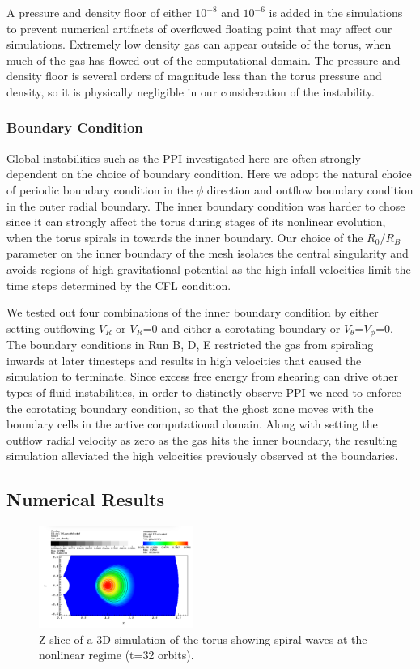 \documentclass[iop,revtex4]{emulateapj}
\begin{document}
\par A pressure and density floor of either $10^{-8}$ and $10^{-6}$ is added in the simulations to prevent numerical artifacts of overflowed floating point that may affect our simulations. Extremely low density gas can appear outside of the torus, when much of the gas has flowed out of the computational domain. The pressure and density floor is several orders of magnitude less than the torus pressure and density, so it is physically negligible in our consideration of the instability.
\subsubsection{Boundary Condition\label{sec:BC}}
\par Global instabilities such as the \ac{PPI} investigated here are often strongly dependent on the choice of boundary condition. Here we adopt the natural choice of  periodic boundary condition in the $\phi$ direction and outflow boundary condition in the outer radial boundary. The inner boundary condition was harder to chose since it can strongly affect the torus during stages of its nonlinear evolution, when the torus spirals in towards the inner boundary. Our choice of the $R_0/R_B$ parameter on the inner boundary of the mesh isolates the central singularity and avoids regions of high gravitational potential as the high infall velocities limit the time steps determined by the \ac{CFL} condition. 
\par We tested out four combinations of the inner boundary condition by either setting outflowing $V_R$ or $V_R$=0 and either a corotating boundary or $V_\theta$=$V_\phi$=0. The boundary conditions in Run B, D, E restricted the gas from spiraling inwards at later timesteps and results in high velocities that caused the simulation to terminate. Since excess free energy from shearing can drive other types of fluid instabilities, in order to distinctly observe \ac{PPI} we need to enforce the corotating boundary condition, so that the ghost zone moves with the boundary cells in the active computational domain.  Along with setting the outflow radial velocity as zero as the gas hits the inner boundary, the resulting simulation alleviated the high velocities previously observed at the boundaries. 
\subsection{Numerical Results\label{ppi_results}}
\begin{figure}
\includegraphics[width=0.45\textwidth,bb=0 0 30 30]{plots/t32_orbit.png}
\caption{Z-slice of a 3D simulation of the torus showing spiral waves at the nonlinear regime (t=32 orbits). }
\label{t32_orbit}
\end{figure}
\end{document}

